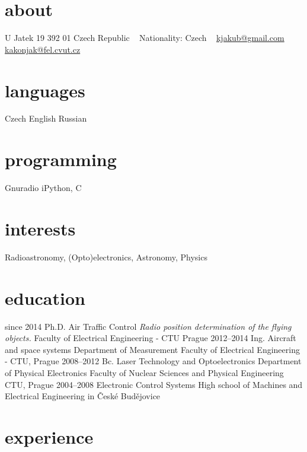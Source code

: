 \documentclass[]{friggeri-cv}
\begin{document}
       {}


\begin{aside}
  \section{about}
    U Jatek 19
    392 01
    Czech Republic
    ~
    Nationality:
    Czech
    ~
    \href{mailto:kjakub@gmail.com}{kjakub@gmail.com}
    \href{mailto:kakonjak@fel.cvut.cz}{kakonjak@fel.cvut.cz}    
  \section{languages}
    Czech
    English
    Russian
  \section{programming}
    Gnuradio
    iPython, C
\end{aside}

\section{interests}

Radioastronomy, (Opto)electronics, Astronomy, Physics 

\section{education}

\begin{entrylist}
  \entry
    {since 2014}
    {Ph.D. {\normalfont Air Traffic Control}}
    {\emph{Radio position determination of the flying objects.}}
    { Faculty of Electrical Engineering - CTU Prague}
  \entry
    {2012–2014}
    {Ing. Aircraft and space systems}
    {Department of Measurement}
    { Faculty of Electrical Engineering - CTU, Prague}
  \entry
    {2008–2012}
    {Bc. Laser Technology and Optoelectronics}
    {Department of Physical Electronics}
    {Faculty of Nuclear Sciences and Physical Engineering CTU, Prague}
  \entry
    {2004–2008}
    {Electronic Control Systems}
    {}
    {High school of Machines and Electrical Engineering in České Budějovice}
\end{entrylist}

\section{experience}
\end{document}
